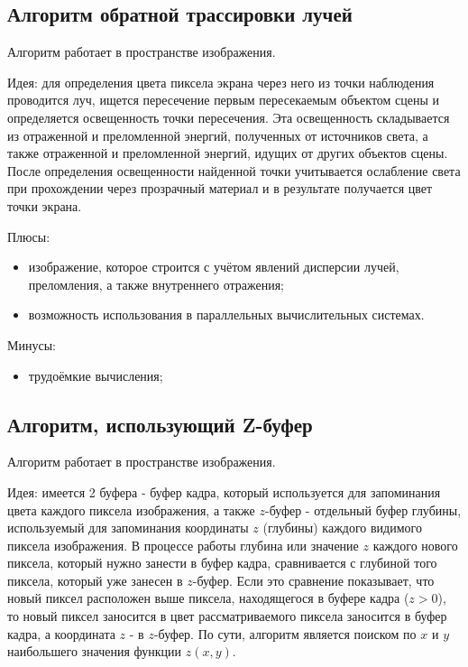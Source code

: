 \subsection{Алгоритм обратной трассировки лучей}
Алгоритм работает в пространстве изображения\cite{raytr}.

Идея: для определения цвета пиксела экрана через него из точки наблюдения
проводится луч, ищется пересечение первым пересекаемым объектом сцены и
определяется освещенность точки пересечения. Эта освещенность складывается из
отраженной и преломленной энергий, полученных от источников света, а также
отраженной и преломленной энергий, идущих от других объектов сцены. После
определения освещенности найденной точки учитывается ослабление света при
прохождении через прозрачный материал и в результате получается цвет точки
экрана.

Плюсы:
\begin{itemize}
    \item изображение, которое строится с учётом явлений дисперсии лучей,
        преломления, а также внутреннего отражения;
    \item возможность использования в параллельных вычислительных системах.
\end{itemize}

Минусы:
\begin{itemize}
    \item трудоёмкие вычисления\cite{tracer_proof};
\end{itemize}

\subsection{Алгоритм, использующий Z-буфер}
Алгоритм работает в пространстве изображения\cite{zbuf}.

Идея: имеется 2 буфера - буфер кадра, который используется для запоминания
цвета каждого пиксела изображения, а также $z$-буфер - отдельный буфер глубины,
используемый для запоминания координаты $z$ (глубины) каждого видимого пиксела
изображения. В процессе работы глубина или значение $z$ каждого нового пиксела,
который нужно занести в буфер кадра, сравнивается с глубиной того пиксела,
который уже занесен в $z$-буфер. Если это сравнение показывает, что новый
пиксел расположен выше пиксела, находящегося в буфере кадра ($z > 0$), то новый
пиксел заносится в цвет рассматриваемого пиксела заносится в буфер кадра, а
координата $z$ - в $z$-буфер. По сути, алгоритм является поиском по $x$ и $y$
наибольшего значения функции $z(x, y)$.

